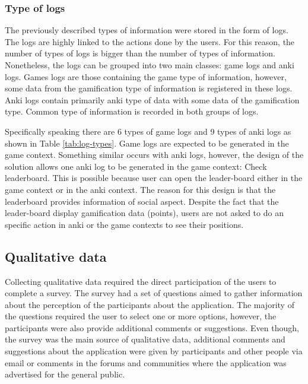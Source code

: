 \subsubsection{Type of logs}
The previously described types of information were stored in the form of logs. The logs are highly linked to the actions done by the users. For this reason, the number of types of logs is bigger than the number of types of information. Nonetheless, the logs can be grouped into two main classes: game logs and anki logs. Games logs are those containing the game type of information, however, some data from the gamification type of information is registered in these logs. Anki logs contain primarily anki type of data with some data of the gamification type. Common type of information is recorded in both groups of logs.

Specifically speaking there are 6 types of game logs and 9 types of anki logs as shown in Table \ref{tab:log-types}. Game logs are expected to be generated in the game context. Something similar occurs with anki logs, however, the design of the solution allows one anki log to be generated in the game context: Check leaderboard. This is possible because user can open the leader-board either in the game context or in the anki context. The reason for this design is that the leaderboard provides information of social aspect. Despite the fact that the leader-board display gamification data (points), users are not asked to do an specific action in anki or the game contexts to see their positions.

\subsection{Qualitative data}
Collecting qualitative data required the direct participation of the users to complete a survey. The survey had a set of questions aimed to gather information about the perception of the participants about the application. The majority of the questions required the user to select one or more options, however, the participants were also provide additional comments or suggestions. Even though, the survey was the main source of qualitative data, additional comments and suggestions about the application were given by participants and other people via email or comments in the forums and communities where the application was advertised for the general public.

